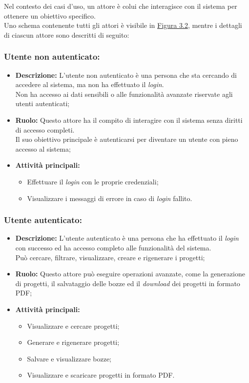 Nel contesto dei casi d'uso, un attore è colui che interagisce con il sistema per ottenere un obiettivo specifico.\\
Uno schema contenente tutti gli attori è visibile in {\hyperref[fig:attori-casi-duso]{Figura 3.2}}, mentre i dettagli di ciascun attore sono descritti di seguito:

\subsubsection*{Utente non autenticato:}

\begin{itemize}
    \item \textbf{Descrizione:}  L'utente non autenticato è una persona che sta cercando di accedere al sistema, ma non ha effettuato il \textit{login}.\\
    Non ha accesso ai dati sensibili o alle funzionalità avanzate riservate agli utenti autenticati;
    \item \textbf{Ruolo:} Questo attore ha il compito di interagire con il sistema senza diritti di accesso completi.\\
    Il suo obiettivo principale è autenticarsi per diventare un utente con pieno accesso al sistema;
    \item \textbf{Attività principali:}
        \begin{itemize}
            \item Effettuare il \textit{login} con le proprie credenziali;
            \item Visualizzare i messaggi di errore in caso di \textit{login} fallito.
        \end{itemize}
\end{itemize}

\subsubsection*{Utente autenticato:}

\begin{itemize}
    \item \textbf{Descrizione:}  L'utente autenticato è una persona che ha effettuato il \textit{login} con successo ed ha accesso completo alle funzionalità del sistema.\\
    Può cercare, filtrare, visualizzare, creare e rigenerare i progetti;
    \item \textbf{Ruolo:} Questo attore può eseguire operazioni avanzate, come la generazione di progetti, il salvataggio delle bozze ed il \textit{download} dei progetti in formato PDF;
    \item \textbf{Attività principali:}
        \begin{itemize}
            \item Visualizzare e cercare progetti;
            \item Generare e rigenerare progetti;
            \item Salvare e visualizzare bozze;
            \item Visualizzare e scaricare progetti in formato PDF.
        \end{itemize}
\end{itemize}

